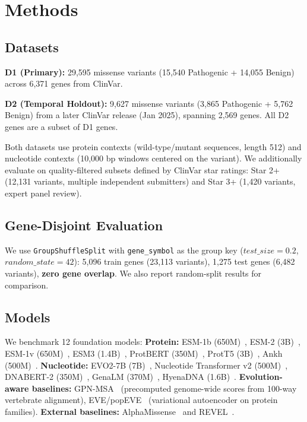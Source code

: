 \documentclass[9pt]{article}
\begin{document}
\section{Methods}

\subsection{Datasets}

\textbf{D1 (Primary):} 29,595 missense variants (15,540 Pathogenic + 14,055 Benign) across 6,371 genes from ClinVar.

\textbf{D2 (Temporal Holdout):} 9,627 missense variants (3,865 Pathogenic + 5,762 Benign) from a later ClinVar release (Jan 2025), spanning 2,569 genes. All D2 genes are a subset of D1 genes.

Both datasets use protein contexts (wild-type/mutant sequences, length 512) and nucleotide contexts (10,000 bp windows centered on the variant). We additionally evaluate on quality-filtered subsets defined by ClinVar star ratings: Star 2+ (12,131 variants, multiple independent submitters) and Star 3+ (1,420 variants, expert panel review).

\subsection{Gene-Disjoint Evaluation}

We use \texttt{GroupShuffleSplit} with \texttt{gene\_symbol} as the group key ($test\_size = 0.2$, $random\_state = 42$): 5,096 train genes (23,113 variants), 1,275 test genes (6,482 variants), \textbf{zero gene overlap}. We also report random-split results for comparison.

\subsection{Models}

We benchmark 12 foundation models: \textbf{Protein:} ESM-1b (650M)~\cite{li2023esm1b}, ESM-2 (3B)~\cite{li2023esm1b}, ESM-1v (650M)~\cite{meier2021language}, ESM3 (1.4B)~\cite{esm3team2024esm3}, ProtBERT (350M)~\cite{elnaggar2022prottrans}, ProtT5 (3B)~\cite{elnaggar2022prottrans}, Ankh (500M)~\cite{elnaggar2023ankh}. \textbf{Nucleotide:} EVO2-7B (7B)~\cite{nguyen2025evo2}, Nucleotide Transformer v2 (500M)~\cite{dalla2024nucleotide}, DNABERT-2 (350M)~\cite{zeng2024dnabert2}, GenaLM (370M)~\cite{singh2024genalm}, HyenaDNA (1.6B)~\cite{nguyen2023hyenadna}. \textbf{Evolution-aware baselines:} GPN-MSA~\cite{benegas2025gpn} (precomputed genome-wide scores from 100-way vertebrate alignment), EVE/popEVE~\cite{frazer2021eve} (variational autoencoder on protein families). \textbf{External baselines:} AlphaMissense~\cite{cheng2023alphamissense} and REVEL~\cite{ioannidis2016revel}.
\end{document}
